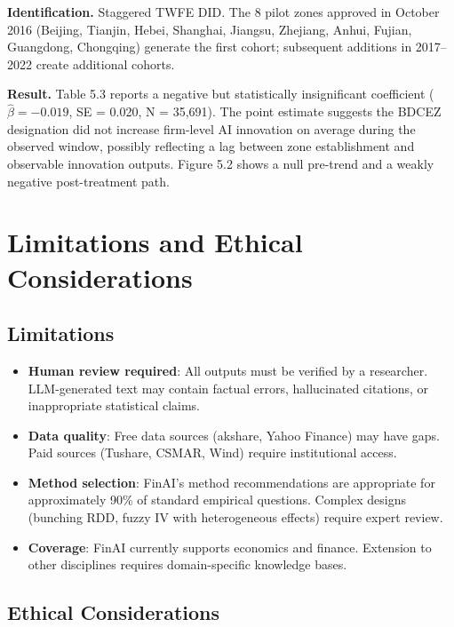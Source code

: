 \documentclass[12pt, a4paper]{article}
\begin{document}
\textbf{Identification.} Staggered TWFE DID.  The 8 pilot zones approved
in October 2016 (Beijing, Tianjin, Hebei, Shanghai, Jiangsu, Zhejiang,
Anhui, Fujian, Guangdong, Chongqing) generate the first cohort; subsequent
additions in 2017--2022 create additional cohorts.

\textbf{Result.} Table 5.3 reports a negative but statistically insignificant
coefficient ($\hat{\beta} = -0.019$, SE = 0.020, N = 35,691).
The point estimate suggests the BDCEZ designation did not
increase firm-level AI innovation on average during the observed window,
possibly reflecting a lag between zone establishment and observable
innovation outputs.  Figure 5.2 shows a null pre-trend and a
weakly negative post-treatment path.%

\section{Limitations and Ethical Considerations}

\subsection{Limitations}

\begin{itemize}
    \item \textbf{Human review required}: All outputs must be verified by a researcher. LLM-generated text may contain factual errors, hallucinated citations, or inappropriate statistical claims.
    \item \textbf{Data quality}: Free data sources (akshare, Yahoo Finance) may have gaps. Paid sources (Tushare, CSMAR, Wind) require institutional access.
    \item \textbf{Method selection}: FinAI's method recommendations are appropriate for approximately 90\% of standard empirical questions. Complex designs (bunching RDD, fuzzy IV with heterogeneous effects) require expert review.
    \item \textbf{Coverage}: FinAI currently supports economics and finance. Extension to other disciplines requires domain-specific knowledge bases.
\end{itemize}

\subsection{Ethical Considerations}
\end{document}
